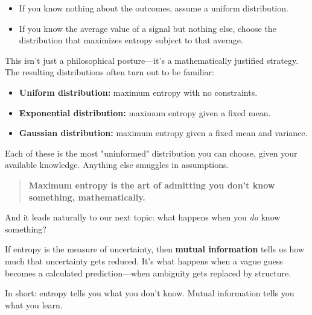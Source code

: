 \begin{itemize}
  \item If you know nothing about the outcomes, assume a uniform distribution.
  \item If you know the average value of a signal but nothing else, choose the distribution that maximizes entropy subject to that average.
\end{itemize}

This isn’t just a philosophical posture—it’s a mathematically justified strategy. The resulting distributions often turn out to be familiar:

\begin{itemize}
  \item \textbf{Uniform distribution:} maximum entropy with no constraints.
  \item \textbf{Exponential distribution:} maximum entropy given a fixed mean.
  \item \textbf{Gaussian distribution:} maximum entropy given a fixed mean and variance.
\end{itemize}



Each of these is the most "uninformed" distribution you can choose, given your available knowledge. Anything else smuggles in assumptions.

\begin{quote}
\textbf{Maximum entropy is the art of admitting you don't know something, mathematically.}
\end{quote}

And it leads naturally to our next topic: what happens when you \emph{do} know something?

If entropy is the measure of uncertainty, then \textbf{mutual information} tells us how much that uncertainty gets reduced. It's what happens when a vague guess becomes a calculated prediction—when ambiguity gets replaced by structure.

In short: entropy tells you what you don't know. Mutual information tells you what you learn.


